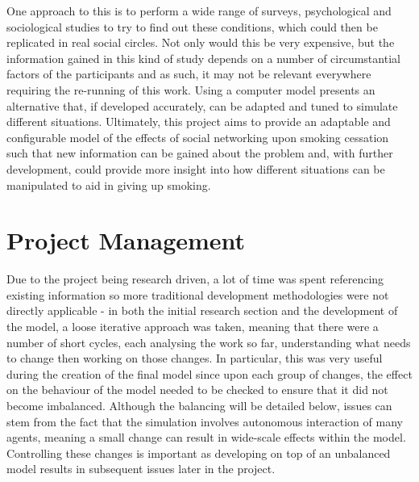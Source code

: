 \documentclass[]{report}
\begin{document}
One approach to this is to perform a wide range of surveys, psychological and sociological studies to try to find out these conditions, which could then be replicated in real social circles. Not only would this be very expensive, but the information gained in this kind of study depends on a number of circumstantial factors of the participants and as such, it may not be relevant everywhere requiring the re-running of this work. Using a computer model presents an alternative that, if developed accurately, can be adapted and tuned to simulate different situations. Ultimately, this project aims to provide an adaptable and configurable model of the effects of social networking upon smoking cessation such that new information can be gained about the problem and, with further development, could provide more insight into how different situations can be manipulated to aid in giving up smoking.

\section{Project Management}

Due to the project being research driven, a lot of time was spent referencing existing information so more traditional development methodologies were not directly applicable - in both the initial research section and the development of the model, a loose iterative approach was taken, meaning that there were a number of short cycles, each analysing the work so far, understanding what needs to change then working on those changes. In particular, this was very useful during the creation of the final model since upon each group of changes, the effect on the behaviour of the model needed to be checked to ensure that it did not become imbalanced. Although the balancing will be detailed below, issues can stem from the fact that the simulation involves autonomous interaction of many agents, meaning a small change can result in wide-scale effects within the model. Controlling these changes is important as developing on top of an unbalanced model results in subsequent issues later in the project.
\end{document}
